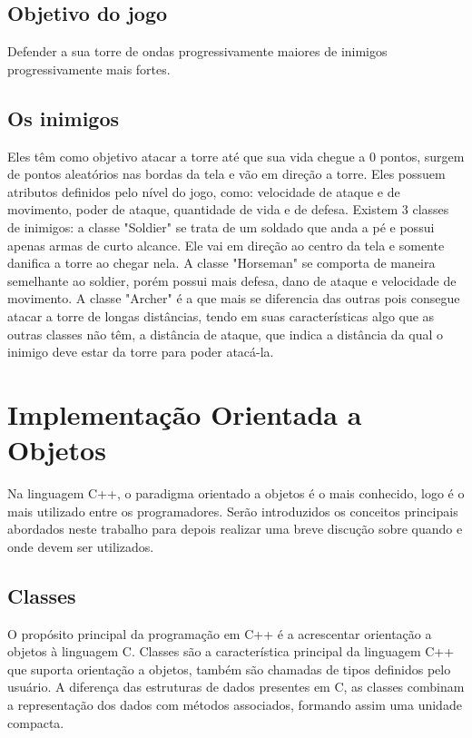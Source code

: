 \documentclass[rel_mlp]{iiufrgs}
\begin{document}
\section{Objetivo do jogo}
Defender a sua torre de ondas progressivamente maiores de inimigos progressivamente mais fortes.

\section{Os inimigos}
Eles têm como objetivo atacar a torre até que sua vida chegue a 0 pontos, surgem de pontos aleatórios nas bordas da tela e vão em direção a torre. Eles possuem atributos definidos pelo nível do jogo, como: velocidade de ataque e de movimento, poder de ataque, quantidade de vida e de defesa.
	Existem 3 classes de inimigos: a classe "Soldier" se trata de um soldado que anda a pé e possui apenas armas de curto alcance. Ele vai em direção ao centro da tela e somente danifica a torre ao chegar nela.
	A classe "Horseman" se comporta de maneira semelhante ao soldier, porém possui mais defesa, dano de ataque e velocidade de movimento.
	A classe "Archer" é a que mais se diferencia das outras pois consegue atacar a torre de longas distâncias, tendo em suas características algo que as outras classes não têm, a distância de ataque, que indica a distância da qual o inimigo deve estar da torre para poder atacá-la.

\chapter{ Implementação Orientada a Objetos} \label{Implementação OO}
Na linguagem C++, o paradigma orientado a objetos é o mais conhecido, logo é o mais utilizado entre os programadores.
Serão introduzidos os conceitos principais abordados neste trabalho para depois realizar uma breve discução sobre quando e onde devem ser utilizados.
\section{Classes}
O propósito principal da programação em C++ é a acrescentar orientação a objetos à linguagem C. Classes são a característica principal da linguagem C++ que suporta orientação a objetos, também são chamadas de tipos definidos pelo usuário. A diferença das estruturas de dados presentes em C, as classes combinam a representação dos dados com métodos associados, formando assim uma unidade compacta.
\bigbreak
\end{document}
